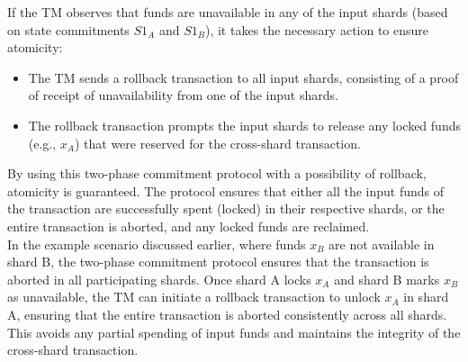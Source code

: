 \documentclass{report}
\begin{document}
If the TM observes that funds are unavailable in any of the input shards (based on state commitments $S1_{A}$ and $S1_{B}$), it takes the necessary action to ensure atomicity:\\
\begin{itemize}
	\item The TM sends a rollback transaction to all input shards, consisting of a proof of receipt of unavailability from one of the input shards.
	\item The rollback transaction prompts the input shards to release any locked funds (e.g., $x_{A}$) that were reserved for the cross-shard transaction.
\end{itemize}
By using this two-phase commitment protocol with a possibility of rollback, atomicity is guaranteed. The protocol ensures that either all the input funds of the transaction are successfully spent (locked) in their respective shards, or the entire transaction is aborted, and any locked funds are reclaimed.\\
In the example scenario discussed earlier, where funds $x_{B}$ are not available in shard B, the two-phase commitment protocol ensures that the transaction is aborted in all participating shards. Once shard A locks $x_{A}$ and shard B marks $x_{B}$ as unavailable, the TM can initiate a rollback transaction to unlock $x_{A}$ in shard A, ensuring that the entire transaction is aborted consistently across all shards. This avoids any partial spending of input funds and maintains the integrity of the cross-shard transaction.
\end{document}

